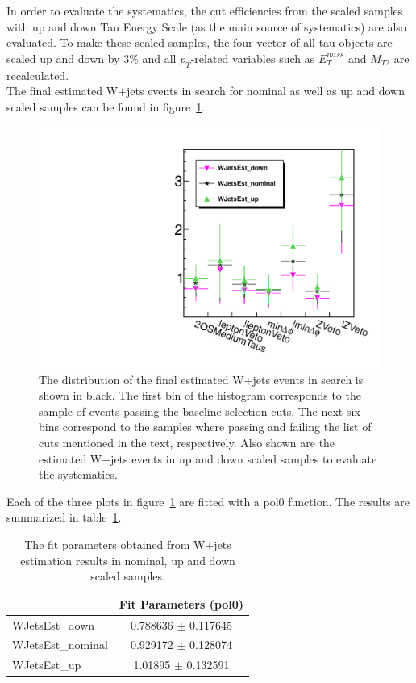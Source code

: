 In order to evaluate the systematics, the cut efficiencies from the scaled samples with 
up and down Tau Energy Scale (as the main source of systematics) are also evaluated.
To make these scaled samples, the four-vector of all tau objects 
are scaled up and down by 3\% and all $p_T$-related variables such as $E_T^{miss}$ 
and $M_{T2}$ are recalculated.\\
The final estimated W+jets events in search \binone for nominal as well as up and down scaled samples 
can be found in figure~\ref{fig:wjets_1}.  
\begin{figure}[iHhtb]
\centering
\includegraphics[angle=0,scale=0.35]{TauTauFigs/WJets_bin1.pdf}
\caption{The distribution of the final estimated W+jets events in search \binone is shown in black. 
 The first bin of the histogram corresponds to the sample of events passing the baseline selection cuts. 
The next six bins correspond to the samples where passing and failing the 
list of cuts mentioned in the text, respectively. Also shown are the estimated W+jets events in up and down scaled samples to evaluate the systematics.}
\label{fig:wjets_1}
\end{figure}

Each of the three plots in figure~\ref{fig:wjets_1} are fitted with a pol0 function. The results are summarized in table~\ref{tbl:fitpars}.
\begin{table}
\begin{center}
\begin{tabular}{lc}
\hline\hline
  & Fit Parameters (pol0) \\
\hline\hline
WJetsEst\_down & 0.788636 $\pm$ 0.117645 \\
WJetsEst\_nominal & 0.929172 $\pm$ 0.128074 \\
WJetsEst\_up & 1.01895 $\pm$ 0.132591 \\
\hline\hline
\end{tabular}
\caption{The fit parameters obtained from W+jets estimation results in nominal, up and down scaled samples.}
\label{tbl:fitpars}
\end{center}
\end{table}

